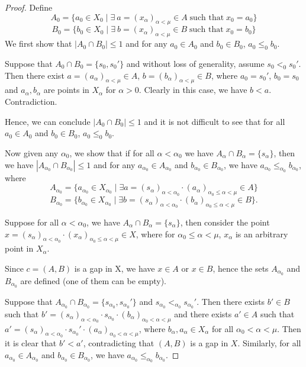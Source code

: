 \documentclass[12pt,oneside,english]{amsbook}
\numberwithin{equation}{section} %
\numberwithin{figure}{section} %
\theoremstyle{plain}
\numberwithin{section}{chapter}
\theoremstyle{plain}
\begin{document}
\begin{proof}
  Define
  $$A_{0}  =  \{a_{0}  \in X_{0} \; | \; \exists \ a  = (x_{\alpha})_{\alpha < \mu}  \in A \; \text{such that} \; x_{0}  =  a_{0} \}$$
  $$B_{0}  =  \{b_{0}  \in X_{0} \; | \; \exists \ b = (x_{\alpha})_{\alpha < \mu}  \in B  \; \text{such that} \; x_{0}  =  b_{0} \}$$
  We first show that  $|A_{0} \cap B_{0}| \leq 1$ and for any  $a_{0} \in A_{0}$ and $b_{0} \in B_{0}$, $a_{0} \leq_0 b_{0}$.

  Suppose that $A_0 \cap B_0 = \{s_{0},s_{0}'\}$ and without loss of generality, assume $s_0 <_0 s_0'$. Then there exist $a = (a_{\alpha})_{\alpha < \mu} \in A$, $b = (b_{\alpha})_{\alpha < \mu} \in B$, where $a_0 = s_0'$, $b_0 = s_0$ and $a_{\alpha}, b_{\alpha}$ are points in $X_{\alpha}$ for $\alpha > 0$. Clearly in this case, we have $b < a$. Contradiction.    
  
  Hence, we can conclude $|A_{0} \cap B_{0}| \leq 1$ and it is not difficult to see that for all $a_{0} \in A_{0}$ and $b_{0} \in B_{0}$, $a_{0} \leq_0 b_{0}$.

  Now given any $\alpha_{0}$, we show that if for all $\alpha < \alpha_{0}$ we have $A_{\alpha} \cap B_{\alpha} = \{s_{\alpha}\}$, then we have $|A_{\alpha_{0}} \cap B_{\alpha_{0}}| \leq 1$ and for any $a_{\alpha_{0}}  \in A_{\alpha_{0}}$ and $b_{\alpha_{0}}  \in B_{\alpha_{0}}$, we have $a_{\alpha_{0}} \leq_{\alpha_0} b_{\alpha_{0}}$, where 
  $$A_{\alpha_0}  =  \{a_{\alpha_{0}}  \in X_{\alpha_{0}} \; | \; \exists a  =  (s_{\alpha})_{\alpha < \alpha_{0}} \cdot (a_{\alpha})_{\alpha_{0} \leq \alpha < \mu}  \in A  \}$$
  $$B_{\alpha_0}  =  \{b_{\alpha_{0}}  \in X_{\alpha_{0}} \; | \; \exists b  =  (s_{\alpha})_{\alpha < \alpha_{0}} \cdot (b_{\alpha})_{\alpha_{0} \leq \alpha < \mu}  \in B  \}.$$ 

  Suppose for all $\alpha < \alpha_{0}$, we have $A_{\alpha} \cap B_{\alpha} = \{s_{\alpha}\}$, then consider the point $x = (s_{\alpha})_{\alpha < \alpha_{0}} \cdot (x_{\alpha})_{\alpha_{0} \leq \alpha < \mu} \in X$, where for $\alpha_0 \leq \alpha < \mu$, $x_{\alpha}$ is an arbitrary point in $X_{\alpha}$.

  Since $c  =  (A,B)$ is a gap in X, we have $x \in A$ or $x \in B$, hence the sets $A_{\alpha_0}$ and $B_{\alpha_0}$ are defined (one of them can be empty).

  Suppose that $A_{\alpha_{0}} \cap B_{\alpha_{0}}  =  \{s_{\alpha_{0}}, s_{\alpha_{0}}'\}$ and $s_{\alpha_{0}} <_{\alpha_0} s_{\alpha_{0}}'$. Then there exists $b' \in B$ such that $b' =  (s_{\alpha})_{\alpha < \alpha_{0}} \cdot s_{\alpha_{0}} \cdot (b_{\alpha})_{\alpha_{0} < \alpha < \mu}$ and there exists $a' \in A$ such that $a' = (s_{\alpha})_{\alpha < \alpha_{0}} \cdot s_{\alpha_{0}}' \cdot (a_{\alpha})_{\alpha_{0} < \alpha < \mu}$, where $b_{\alpha},a_{\alpha} \in X_{\alpha}$ for all $\alpha_0 < \alpha < \mu$. Then it is clear that $b' < a'$, contradicting that $(A,B)$ is a gap in $X$. Similarly, for all $a_{\alpha_{0}} \in A_{\alpha_{0}}$ and $b_{\alpha_{0}}  \in B_{\alpha_{0}}$, we have $a_{\alpha_{0}} \leq_{\alpha_0} b_{\alpha_{0}}$.


\end{proof}
\end{document}
